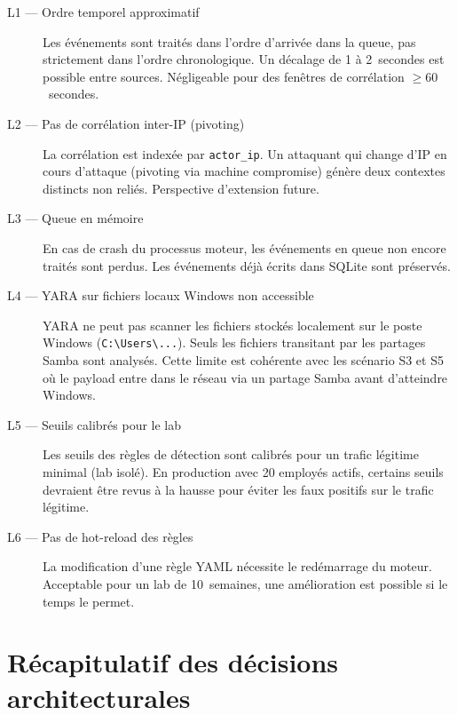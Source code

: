 \documentclass[12pt,a4paper]{article}
\begin{document}
\begin{description}
    \item[L1 --- Ordre temporel approximatif] Les événements sont traités
    dans l'ordre d'arrivée dans la queue, pas strictement dans l'ordre
    chronologique. Un décalage de 1 à 2~secondes est possible entre sources.
    Négligeable pour des fenêtres de corrélation $\geq 60$~secondes.

    \item[L2 --- Pas de corrélation inter-IP (pivoting)] La corrélation
    est indexée par \texttt{actor\_ip}. Un attaquant qui change d'IP en
    cours d'attaque (pivoting via machine compromise) génère deux contextes
    distincts non reliés. Perspective d'extension future.

    \item[L3 --- Queue en mémoire] En cas de crash du processus moteur,
    les événements en queue non encore traités sont perdus. Les événements
    déjà écrits dans SQLite sont préservés.

    \item[L4 --- YARA sur fichiers locaux Windows non accessible]
YARA ne peut pas scanner les fichiers stockés localement
sur le poste Windows (\texttt{C:\textbackslash Users\textbackslash ...}).
Seuls les fichiers transitant par les partages Samba sont
analysés. Cette limite est cohérente avec les scénario S3 et S5
où le payload entre dans le réseau via un partage Samba
avant d'atteindre Windows.

    \item[L5 --- Seuils calibrés pour le lab] Les seuils des règles de
    détection sont calibrés pour un trafic légitime minimal (lab isolé).
    En production avec 20 employés actifs, certains seuils devraient être
    revus à la hausse pour éviter les faux positifs sur le trafic légitime.

    \item[L6 --- Pas de hot-reload des règles] La modification d'une règle
    YAML nécessite le redémarrage du moteur. Acceptable pour un lab de
    10~semaines, une amélioration est possible si le temps le permet.
\end{description}

\section{Récapitulatif des décisions architecturales}
\end{document}
